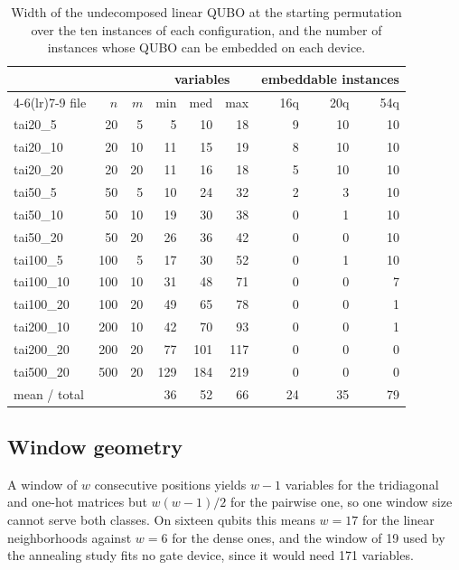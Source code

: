 \documentclass[runningheads]{llncs}
\begin{document}
\begin{table}[!t]
\caption{Width of the undecomposed linear QUBO at the starting permutation over
the ten instances of each configuration, and the number of instances whose QUBO
can be embedded on each device.}
\label{tab:cap}
\centering
\begin{tabular*}{\textwidth}{@{\extracolsep{\fill}}lrrrrrrrr@{}}
\toprule
& & & \multicolumn{3}{c}{variables} & \multicolumn{3}{c}{embeddable instances} \\
\cmidrule(lr){4-6}\cmidrule(lr){7-9}
file & $n$ & $m$ & min & med & max & 16q & 20q & 54q \\
\midrule
tai20\_5 & 20 & 5 & 5 & 10 & 18 & 9 & 10 & 10 \\
tai20\_10 & 20 & 10 & 11 & 15 & 19 & 8 & 10 & 10 \\
tai20\_20 & 20 & 20 & 11 & 16 & 18 & 5 & 10 & 10 \\
tai50\_5 & 50 & 5 & 10 & 24 & 32 & 2 & 3 & 10 \\
tai50\_10 & 50 & 10 & 19 & 30 & 38 & 0 & 1 & 10 \\
tai50\_20 & 50 & 20 & 26 & 36 & 42 & 0 & 0 & 10 \\
tai100\_5 & 100 & 5 & 17 & 30 & 52 & 0 & 1 & 10 \\
tai100\_10 & 100 & 10 & 31 & 48 & 71 & 0 & 0 & 7 \\
tai100\_20 & 100 & 20 & 49 & 65 & 78 & 0 & 0 & 1 \\
tai200\_10 & 200 & 10 & 42 & 70 & 93 & 0 & 0 & 1 \\
tai200\_20 & 200 & 20 & 77 & 101 & 117 & 0 & 0 & 0 \\
tai500\_20 & 500 & 20 & 129 & 184 & 219 & 0 & 0 & 0 \\
\midrule
mean / total & & & 36 & 52 & 66 & 24 & 35 & 79 \\
\bottomrule
\end{tabular*}
\end{table}

\subsection{Window geometry}
A window of $w$ consecutive positions yields $w-1$ variables for the
tridiagonal and one-hot matrices but $w(w-1)/2$ for the pairwise one, so one
window size cannot serve both classes. On sixteen qubits this means $w = 17$ for
the linear neighborhoods against $w = 6$ for the dense ones, and the window of
19 used by the annealing study fits no gate device, since it would need 171
variables.
\end{document}

